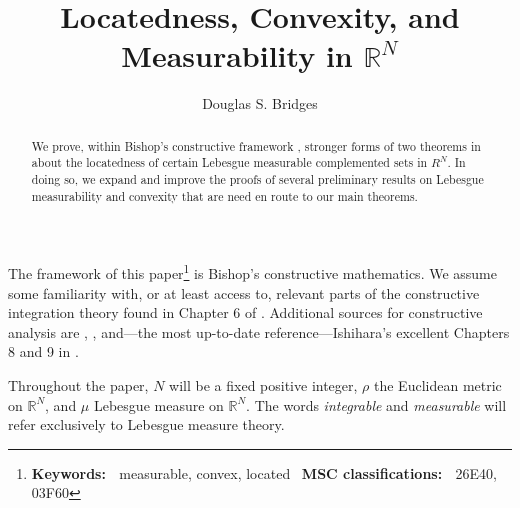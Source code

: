 \documentclass[11pt]{article}%
\begin{document}
\date{}
\title{\textsf{Locatedness, Convexity, and Measurability in }$\mathbb{R}^{N}$}
\author{\textsf{Douglas S. Bridges}}
\maketitle

\begin{abstract}%
\noindent
\textsf{We prove, within Bishop's constructive framework \cite{Bishop},
stronger forms of two theorems in \cite{Br88} about the locatedness of certain
Lebesgue measurable complemented sets in }$R^{N}$\textsf{. In doing so, we
expand and improve the proofs of several preliminary results on Lebesgue
measurability and convexity that are need en route to our main theorems.}

\end{abstract}

%

\setcounter{secnumdepth}{0}%
\normalfont\sf
%

\bigskip
%

\noindent
The framework of this paper\footnote{%
\normalfont\sf
\textbf{Keywords: \ }measurable, convex, located \ \textbf{MSC
classifications: \ }26E40, 03F60} is Bishop's constructive mathematics. We
assume some familiarity with, or at least access to, relevant parts of the
constructive integration theory found in Chapter 6 of \cite{BB}. Additional
sources for constructive analysis are \cite{Bishop}, \cite{BVtech}, and---the
most up-to-date reference---Ishihara's excellent Chapters 8 and 9 in
\cite{Handbook}.

Throughout the paper, $N$ will be a fixed positive integer, $\rho$ the
Euclidean metric on $\mathbb{R}^{N}$, and $\mu$ Lebesgue measure on
$\mathbb{R}^{N}$. The words\emph{ integrable} and \emph{measurable} will refer
exclusively to Lebesgue measure theory.
\end{document}
